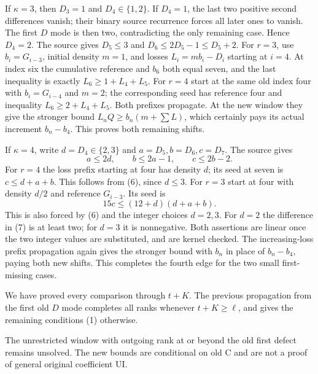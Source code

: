 If $\kappa=3$, then $D_3=1$ and $D_4\in\{1,2\}$.
If $D_4=1$, the last two positive second differences vanish;
their binary source recurrence forces all later ones to vanish.
The first $D$ mode is then two, contradicting the only remaining
case. Hence $D_4=2$. The source gives $D_5\le3$ and
$D_6\le2D_5-1\le D_5+2$.
For $r=3$, use $b_i=G_{i-3}$, initial density $m=1$, and
losses $L_i=mb_i-D_i$ starting at $i=4$.
At index six the cumulative reference and $b_6$ both equal seven,
and the last inequality is exactly
$L_6\ge1+L_4+L_5$. For $r=4$ start at the same old index
four with $b_i=G_{i-4}$ and $m=2$; the corresponding seed
has reference four and inequality $L_6\ge2+L_4+L_5$.
Both prefixes propagate. At the new window they give the stronger
bound $L_nQ\ge b_n(m+\sum L)$, which certainly pays its actual
increment $b_n-b_4$. This proves both remaining shifts.

If $\kappa=4$, write $d=D_4\in\{2,3\}$ and
$a=D_5,b=D_6,c=D_7$. The source gives
\[
       a\le2d,\qquad b\le2a-1,\qquad c\le2b-2.              \tag{6}
\]
For $r=4$ the loss prefix starting at four has density $d$;
its seed at seven is $c\le d+a+b$.
This follows from (6), since $d\le3$.
For $r=3$ start at four with density $d/2$ and reference
$G_{i-3}$. Its seed is
\[
                  15c\le(12+d)(d+a+b).                      \tag{7}
\]
This is also forced by (6) and the integer choices $d=2,3$.
For $d=2$ the difference in (7) is at least two;
for $d=3$ it is nonnegative. Both assertions are linear once
the two integer values are substituted, and are kernel checked.
The increasing-loss prefix propagation again gives the stronger
bound with $b_n$ in place of $b_n-b_4$, paying both new shifts.
This completes the fourth edge for the two small first-missing cases.

We have proved every comparison through $t+K$.
The previous propagation from the first old $D$ mode completes
all ranks whenever $t+K\ge\ell$, and gives the remaining
conditions (1) otherwise.

The unrestricted window with outgoing rank at or beyond the old
first defect remains unsolved. The new bounds are conditional on
old C and are not a proof of general original coefficient UI.
